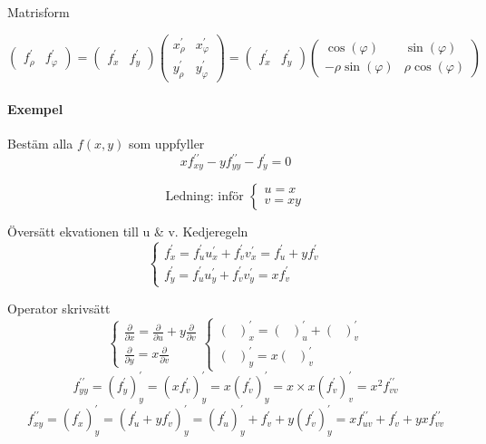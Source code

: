 \documentclass{article}
\begin{document}
Matrisform

\[
	\begin{pmatrix}f_{\rho}^{\prime} & f_{\varphi}^{\prime}\end{pmatrix} =
	\begin{pmatrix}f_{x}^{\prime} & f_{y}^{\prime}\end{pmatrix}
	\begin{pmatrix}x_{\rho}^{\prime} & x_{\varphi}^{\prime} \\
	y_{\rho}^{\prime} & y_{\varphi}^{\prime}\end{pmatrix} =
	\begin{pmatrix}f_{x}^{\prime} & f_{y}^{\prime}\end{pmatrix}
	\begin{pmatrix}\cos(\varphi) & \sin(\varphi) \\
	-\rho\sin(\varphi) & \rho\cos(\varphi)\end{pmatrix}
\]

\newpage

\paragraph{Exempel} 
Bestäm alla \(f(x,y)\) som uppfyller
\begin{equation}
	xf_{xy}^{\prime\prime} - yf_{yy}^{\prime\prime} - f_{y}^{\prime} = 0
\end{equation}

\[
\text{Ledning: inför }
\left\{\begin{array}{rcl}
	u = x \\
	v = xy
\end{array}\right.
\]

Översätt ekvationen till u \& v. Kedjeregeln
\[
\left\{\begin{array}{rcl}
	f_{x}^{\prime} = f_{u}^{\prime}u_{x}^{\prime} + f_{v}^{\prime}v_{x}^{\prime} = f_{u}^{\prime} + yf_{v}^{\prime} \\
	f_{y}^{\prime} = f_{u}^{\prime}u_{y}^{\prime} + f_{v}^{\prime}v_{y}^{\prime} = xf_{v}^{\prime} 
\end{array}\right.
\]

Operator skrivsätt
\[
\left\{\begin{array}{rcl}
	\frac{\partial}{\partial x} = \frac{\partial}{\partial u} + y\frac{\partial}{\partial v}\\
	\frac{\partial}{\partial y} = x\frac{\partial}{\partial v}
\end{array}\right.
\left\{\begin{array}{rcl}
	(\text{ })_{x}^{\prime} = (\text{ })_{u}^{\prime} + (\text{ })_{v}^{\prime} \\
	(\text{ })_{y}^{\prime} = x(\text{ })_{v}^{\prime}
\end{array}\right.
\]
\[
	f_{yy}^{\prime\prime} = (f_{y}^{\prime})_{y}^{\prime} = (xf_{v}^{\prime})_{y}^{\prime} = x(f_{v}^{\prime})_{y}^{\prime} = x \times x(f_{v}^{\prime})_{v}^{\prime} = x^2 f_{vv}^{\prime\prime}
\]
\[
	f_{xy}^{\prime\prime} = (f_{x}^{\prime})_{y}^{\prime} = (f_{u}^{\prime} + yf_{v}^{\prime})_{y}^{\prime} =
	(f_{u}^{\prime})_{y}^{\prime} + f_{v}^{\prime} + y(f_{v}^{\prime})_{y}^{\prime} =
	xf_{uv}^{\prime\prime} + f_{v}^{\prime} + yxf_{vv}^{\prime\prime}
\]
\end{document}
